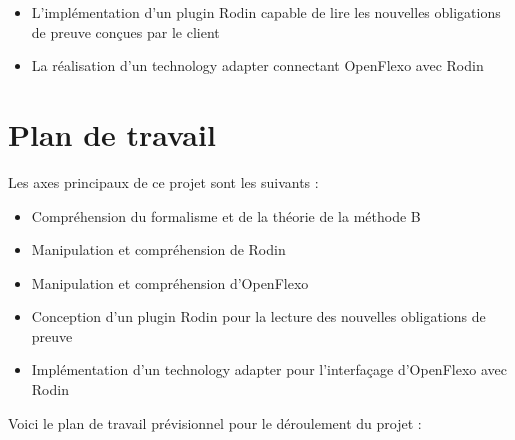 \documentclass{article}
\begin{document}
\vspace{\baselineskip}
\begin{itemize}
    \item L'implémentation d'un plugin Rodin capable de lire les nouvelles obligations de preuve conçues par le client
    \item La réalisation d'un technology adapter connectant OpenFlexo avec Rodin
\end{itemize}

\newpage



\section{Plan de travail}

Les axes principaux de ce projet sont les suivants :

\vspace{\baselineskip}
\begin{itemize}
    \item Compréhension du formalisme et de la théorie de la méthode B
    \item Manipulation et compréhension de Rodin
    \item Manipulation et compréhension d'OpenFlexo
    \item Conception d'un plugin Rodin pour la lecture des nouvelles obligations de preuve
    \item Implémentation d'un technology adapter pour l'interfaçage d'OpenFlexo avec Rodin
\end{itemize}
\vspace{\baselineskip}

Voici le plan de travail prévisionnel pour le déroulement du projet :

\vspace{\baselineskip}
\end{document}
